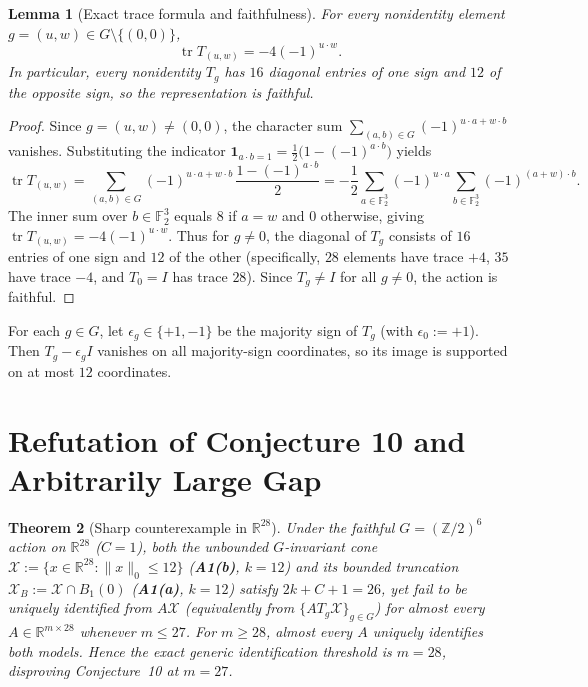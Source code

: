 \documentclass[11pt]{article}
\theoremstyle{plain}
\newtheorem{theorem}{Theorem}
\newtheorem{lemma}[theorem]{Lemma}
\theoremstyle{definition}
\theoremstyle{remark}
\DeclareMathOperator{\tr}{tr}
\begin{document}
\begin{lemma}[Exact trace formula and faithfulness]\label{lem:trace}
For every nonidentity element $g = (u, w) \in G \setminus \{(0, 0)\}$,
\[
\tr T_{(u,w)} = -4(-1)^{u \cdot w}.
\]
In particular, every nonidentity $T_g$ has $16$ diagonal entries of one sign and $12$ of the opposite sign, so the representation is faithful.
\end{lemma}

\begin{proof}
Since $g = (u, w) \neq (0, 0)$, the character sum $\sum_{(a,b) \in G} (-1)^{u \cdot a + w \cdot b}$ vanishes.
Substituting the indicator $\mathbf{1}_{a \cdot b = 1} = \frac{1}{2}\bigl(1 - (-1)^{a \cdot b}\bigr)$ yields
\[
\tr T_{(u,w)}
= \sum_{(a,b) \in G} (-1)^{u \cdot a + w \cdot b}\,\frac{1 - (-1)^{a \cdot b}}{2}
= -\frac{1}{2} \sum_{a \in \mathbb{F}_2^3} (-1)^{u \cdot a} \sum_{b \in \mathbb{F}_2^3} (-1)^{(a + w) \cdot b}.
\]
The inner sum over $b \in \mathbb{F}_2^3$ equals $8$ if $a = w$ and $0$ otherwise, giving $\tr T_{(u,w)} = -4(-1)^{u \cdot w}$.
Thus for $g \neq 0$, the diagonal of $T_g$ consists of $16$ entries of one sign and $12$ of the other (specifically, $28$ elements have trace $+4$, $35$ have trace $-4$, and $T_0 = I$ has trace $28$).
Since $T_g \neq I$ for all $g \neq 0$, the action is faithful.
\end{proof}

For each $g \in G$, let $\epsilon_g \in \{+1, -1\}$ be the majority sign of $T_g$ (with $\epsilon_0 := +1$).
Then $T_g - \epsilon_g I$ vanishes on all majority-sign coordinates, so its image is supported on at most $12$ coordinates.

\section{Refutation of Conjecture 10 and Arbitrarily Large Gap}

\begin{theorem}[Sharp counterexample in $\mathbb{R}^{28}$]\label{thm:main}
Under the faithful $G = (\mathbb{Z}/2)^6$ action on $\mathbb{R}^{28}$ ($C = 1$), both the unbounded $G$-invariant cone $\mathcal{X} := \{x \in \mathbb{R}^{28} : \|x\|_0 \le 12\}$ (\textup{\textbf{A1(b)}}, $k = 12$) and its bounded truncation $\mathcal{X}_B := \mathcal{X} \cap B_1(0)$ (\textup{\textbf{A1(a)}}, $k = 12$) satisfy $2k + C + 1 = 26$, yet fail to be uniquely identified from $A\mathcal{X}$ (equivalently from $\{A T_g \mathcal{X}\}_{g \in G}$) for almost every $A \in \mathbb{R}^{m \times 28}$ whenever $m \le 27$.
For $m \ge 28$, almost every $A$ uniquely identifies both models.
Hence the exact generic identification threshold is $m = 28$, disproving Conjecture~10 at $m = 27$.
\end{theorem}
\end{document}
